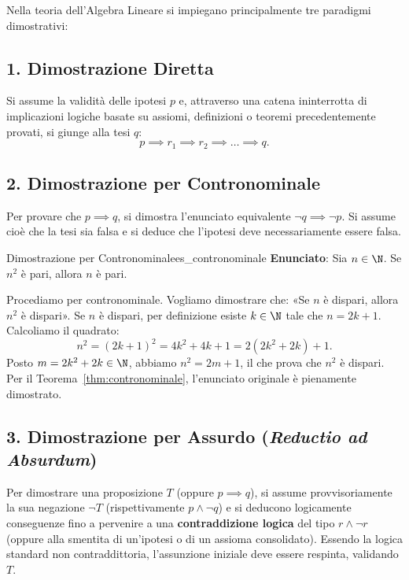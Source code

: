 Nella teoria dell'Algebra Lineare si impiegano principalmente tre paradigmi dimostrativi:

\subsection{1. Dimostrazione Diretta}
Si assume la validità delle ipotesi $p$ e, attraverso una catena ininterrotta di implicazioni logiche basate su assiomi, definizioni o teoremi precedentemente provati, si giunge alla tesi $q$:
\begin{equation}
    p \implies r_1 \implies r_2 \implies \dots \implies q.
\end{equation}

\subsection{2. Dimostrazione per Contronominale}
Per provare che $p \implies q$, si dimostra l'enunciato equivalente $\neg q \implies \neg p$. Si assume cioè che la tesi sia falsa e si deduce che l'ipotesi deve necessariamente essere falsa.

\begin{esempio}{Dimostrazione per Contronominale}{es_contronominale}
\textbf{Enunciato}: Sia $n \in \N$. Se $n^2$ è pari, allora $n$ è pari.
\begin{dimostrazione}
Procediamo per contronominale. Vogliamo dimostrare che: «Se $n$ è dispari, allora $n^2$ è dispari».
Se $n$ è dispari, per definizione esiste $k \in \N$ tale che $n = 2k + 1$.
Calcoliamo il quadrato:
\begin{equation}
    n^2 = (2k + 1)^2 = 4k^2 + 4k + 1 = 2(2k^2 + 2k) + 1.
\end{equation}
Posto $m = 2k^2 + 2k \in \N$, abbiamo $n^2 = 2m + 1$, il che prova che $n^2$ è dispari.
Per il Teorema~\ref{thm:contronominale}, l'enunciato originale è pienamente dimostrato.
\end{dimostrazione}
\end{esempio}

\subsection{3. Dimostrazione per Assurdo (\emph{Reductio ad Absurdum})}
Per dimostrare una proposizione $T$ (oppure $p \implies q$), si assume provvisoriamente la sua negazione $\neg T$ (rispettivamente $p \land \neg q$) e si deducono logicamente conseguenze fino a pervenire a una \textbf{contraddizione logica} del tipo $r \land \neg r$ (oppure alla smentita di un'ipotesi o di un assioma consolidato). Essendo la logica standard non contraddittoria, l'assunzione iniziale deve essere respinta, validando $T$.


